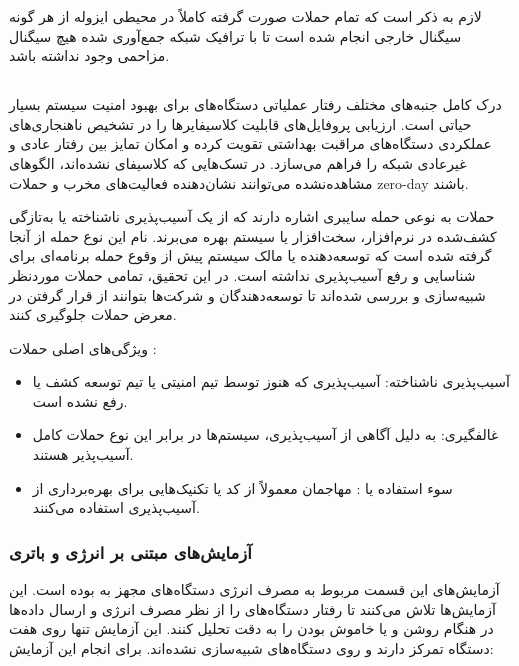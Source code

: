 لازم به ذکر است که تمام حملات صورت گرفته کاملاً در محیطی ایزوله از هر گونه
سیگنال خارجی انجام شده است تا با ترافیک شبکه جمع‌آوری شده هیچ سیگنال مزاحمی
وجود نداشته باشد.

\subsection{}

درک کامل جنبه‌های مختلف رفتار عملیاتی دستگاه‌های  برای بهبود امنیت سیستم
بسیار حیاتی است. ارزیابی پروفایل‌های  قابلیت کلاسیفایرها را در تشخیص
ناهنجاری‌های عملکردی دستگاه‌های مراقبت بهداشتی تقویت کرده و امکان تمایز بین
رفتار عادی و غیرعادی شبکه را فراهم می‌سازد. در تسک‌هایی که کلاسیفای نشده‌اند،
الگوهای مشاهده‌نشده می‌توانند نشان‌دهنده فعالیت‌های مخرب و حملات zero-day باشند.

حملات  به نوعی حمله سایبری اشاره دارند که از یک آسیب‌پذیری ناشناخته
یا به‌تازگی کشف‌شده در نرم‌افزار، سخت‌افزار یا سیستم بهره می‌برند. نام این نوع
حمله از آنجا گرفته شده است که توسعه‌دهنده یا مالک سیستم پیش از وقوع حمله
برنامه‌ای برای شناسایی و رفع آسیب‌پذیری نداشته است. در این تحقیق، تمامی حملات
موردنظر شبیه‌سازی و بررسی شده‌اند تا توسعه‌دهندگان و شرکت‌ها بتوانند از قرار
گرفتن در معرض حملات  جلوگیری کنند.

ویژگی‌های اصلی حملات  \cite{enwiki:1268124149}:

\begin{itemize}
    \item آسیب‌پذیری ناشناخته: آسیب‌پذیری که هنوز توسط تیم امنیتی یا تیم توسعه
    کشف یا رفع نشده است.
    \item غالفگیری: به دلیل آگاهی از آسیب‌‌پذیری، سیستم‌ها در برابر این نوع
    حملات کامل آسیب‌پذیر هستند.
    \item سوء استفاده یا : مهاجمان معمولاً از کد یا تکنیک‌هایی برای
    بهره‌برداری از آسیب‌پذیری استفاده می‌کنند.
\end{itemize}

\subsubsection{آزمایش‌های مبتنی بر انرژی و باتری}

آزمایش‌های این قسمت مربوط به مصرف انرژی دستگاه‌های مجهز به  بوده است.
این آزمایش‌ها تلاش می‌کنند تا رفتار دستگاه‌های  را از نظر مصرف انرژی و
ارسال داده‌ها در هنگام روشن و یا خاموش بودن را به دقت تحلیل کنند. این آزمایش
تنها روی هفت دستگاه  تمرکز دارند و روی دستگاه‌های  شبیه‌سازی
نشده‌اند. برای انجام این آزمایش:

